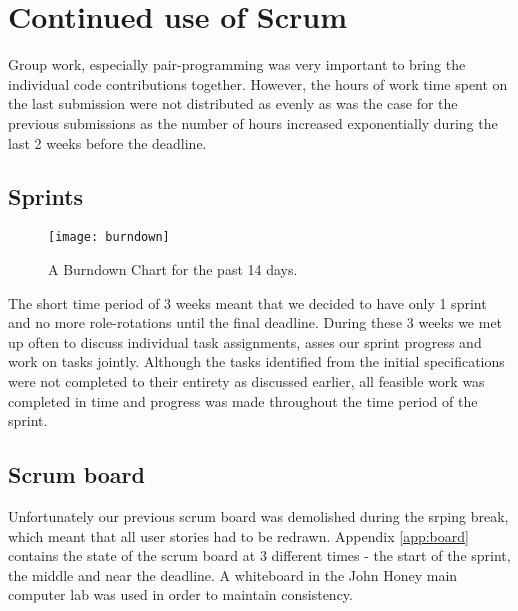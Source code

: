 \section{Continued use of Scrum}
Group work, especially pair-programming was very important to bring the individual code contributions together. However, the hours of work time spent on the last submission were not distributed as evenly as was the case for the previous submissions as the number of hours increased exponentially during the last 2 weeks before the deadline.
\subsection{Sprints}

\begin{figure}[h]
	\centering
	\texttt{[image: burndown]}
	\caption{A Burndown Chart for the past 14 days.}\label{fig:burn}
\end{figure}
The short time period of 3 weeks meant that we decided to have only 1 sprint and no more role-rotations until the final deadline. During these 3 weeks we met up often to discuss individual task assignments, asses our sprint progress and work on tasks jointly. Although the tasks identified from the initial specifications were not completed to their entirety as discussed earlier, all feasible work was completed in time and progress was made throughout the time period of the sprint.
\subsection{Scrum board}
Unfortunately our previous scrum board was demolished during the srping break, which meant that all user stories had to be redrawn. Appendix \ref{app:board} contains the state of the scrum board at 3 different times - the start of the sprint, the middle and near the deadline. A whiteboard in the John Honey main computer lab was used in order to maintain consistency. 